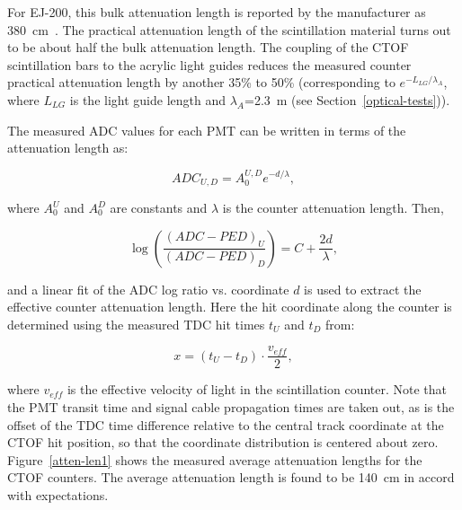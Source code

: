 \documentclass{elsart}
\begin{document}
For EJ-200, this bulk attenuation length is reported by the manufacturer as 380~cm~\cite{scint-spec}.
The practical attenuation length of the scintillation material turns out to be about half the bulk
attenuation length. The coupling of the CTOF scintillation bars to the acrylic light guides reduces the
measured counter practical attenuation length by another 35\% to 50\% (corresponding to
$e^{-L_{LG}/\lambda_A}$, where $L_{LG}$ is the light guide length and $\lambda_A$=2.3~m (see
Section~\ref{optical-tests})).

The measured ADC values for each PMT can be written in terms of the attenuation length as:

\begin{equation}
\label{al-adc}
ADC_{U,D} = A_0^{U,D} e^{-d/\lambda},
\end{equation}

\noindent
where $A_0^U$ and $A_0^D$ are constants and $\lambda$ is the counter attenuation length. Then,

\begin{equation}
\label{linear}
\log \left( \frac{(ADC-PED)_U}{(ADC-PED)_D} \right ) = C + \frac{2d}{\lambda}, 
\end{equation}

\noindent
and a linear fit of the ADC log ratio vs. coordinate $d$ is used to extract the effective counter attenuation
length. Here the hit coordinate along the counter is determined using the measured TDC hit times $t_U$
and $t_D$ from:

\begin{equation}
\label{coor}
x = (t_U - t_D) \cdot \frac{v_{eff}}{2},
\end{equation}

\noindent
where $v_{eff}$ is the effective velocity of light in the scintillation counter. Note that the PMT transit
time and signal cable propagation times are taken out, as is the offset of the TDC time difference
relative to the central track coordinate at the CTOF hit position, so that the coordinate distribution is
centered about zero. Figure~\ref{atten-len1} shows the measured average attenuation lengths for the
CTOF counters. The average attenuation length is found to be 140~cm in accord with expectations. 
\end{document}
